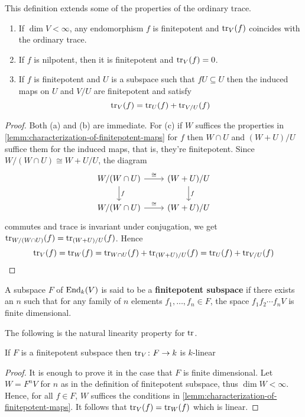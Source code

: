 This definition extends some of the properties of the ordinary trace.
\begin{lemma}\label{lemm:properties-trace}
	\begin{enumerate}[label = (\alph*)]
		\item If $\dim V < \infty$, any endomorphism $f$ is finitepotent and $\operatorname{tr}_{V}(f)$ coincides with the ordinary trace.
		\item If $f$ is nilpotent, then it is finitepotent and $\operatorname{tr}_{V}(f) = 0$.
		\item If $f$ is finitepotent and $U$ is a subspace such that $f U \subseteq U$ then the induced maps on $U$ and $V/U$ are finitepotent and satisfy
		\[
		 	\operatorname{tr}_{V}(f) = \operatorname{tr}_{U}(f) + \operatorname{tr}_{V/U}(f)
		 \] 
	\end{enumerate}
\end{lemma}
\begin{proof}
	Both (a) and (b) are immediate. For (c) if $W$ suffices the properties in \cref{lemm:characterization-of-finitepotent-maps} for $f$ then $W\cap U$ and $(W + U)/U$ suffice them for the induced maps, that is, they're finitepotent. Since $W/(W\cap U) \cong W+U/U$, the diagram
	\[
		\begin{tikzcd}
			W/(W\cap U) \arrow[r, "\cong"] \arrow[d, "f"] & (W+U)/U \arrow[d, "f"] \\
			W/(W\cap U) \arrow[r, "\cong"] & (W+U)/U
		\end{tikzcd}
	\]
	commutes and trace is invariant under conjugation, we get $\operatorname{tr}_{W/(W\cap U)}(f) = \operatorname{tr}_{(W+U)/U}(f)$. Hence
	\[
	 	\operatorname{tr}_{V}(f) = \operatorname{tr}_{W}(f) = \operatorname{tr}_{W\cap U}(f) + \operatorname{tr}_{(W+U)/U}(f) = \operatorname{tr}_{U}(f) + \operatorname{tr}_{V/U}(f)
	\]
\end{proof}
\begin{definition}\label{def:finitepotent subspace}
	A subspace $F$ of $\operatorname{End}_{k}(V)$ is said to be a \textbf{finitepotent subspace} if there exists an $n$ such that for any family of $n$ elements $f_{1}, \ldots, f_{n}\in F$, the space $f_{1}f_{2}\cdots f_{n}V$ is finite dimensional.
\end{definition}
The following is the natural linearity property for $\operatorname{tr}$.
\begin{proposition}\label{prop:linearity-trace}
	If $F$ is a finitepotent subspace then $\operatorname{tr}_{V}\colon F\to k$ is $k$-linear
\end{proposition}
\begin{proof}
	It is enough to prove it in the case that $F$ is finite dimensional. Let $W = F^{n}V$ for $n$ as in the definition of finitepotent subspace, thus $\dim W < \infty$. Hence, for all $f\in F$, $W$ suffices the conditions in \cref{lemm:characterization-of-finitepotent-maps}. It follows that $\operatorname{tr}_{V}(f) = \operatorname{tr}_{W}(f)$ which is linear.
\end{proof}
